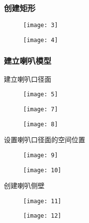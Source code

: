 \documentclass{../source/Experiment}
\begin{document}
            \subsubsection{创建矩形}

            \begin{figure}[H]
                \centering
                \texttt{[image: 3]}
                \caption{}
            \end{figure}
            
            \begin{figure}[H]
                \centering
                \texttt{[image: 4]}
                \caption{}
            \end{figure}
            
            \subsubsection{建立喇叭模型}

            建立喇叭口径面
            \begin{figure}[H]
                \centering
                \texttt{[image: 5]}
                \caption{}
            \end{figure}

            \begin{figure}[H]
                \centering
                \texttt{[image: 7]}
                \caption{}
            \end{figure}

            \begin{figure}[H]
                \centering
                \texttt{[image: 8]}
                \caption{}
            \end{figure}


            设置喇叭口径面的空间位置

            \begin{figure}[H]
                \centering
                \texttt{[image: 9]}
                \caption{}
            \end{figure}


            \begin{figure}[H]
                \centering
                \texttt{[image: 10]}
                \caption{}
            \end{figure}
            创建喇叭侧壁
            \begin{figure}[H]
                \centering
                \texttt{[image: 11]}
                \caption{}
            \end{figure}
            \begin{figure}[H]
                \centering
                \texttt{[image: 12]}
                \caption{}
            \end{figure}
\end{document}

